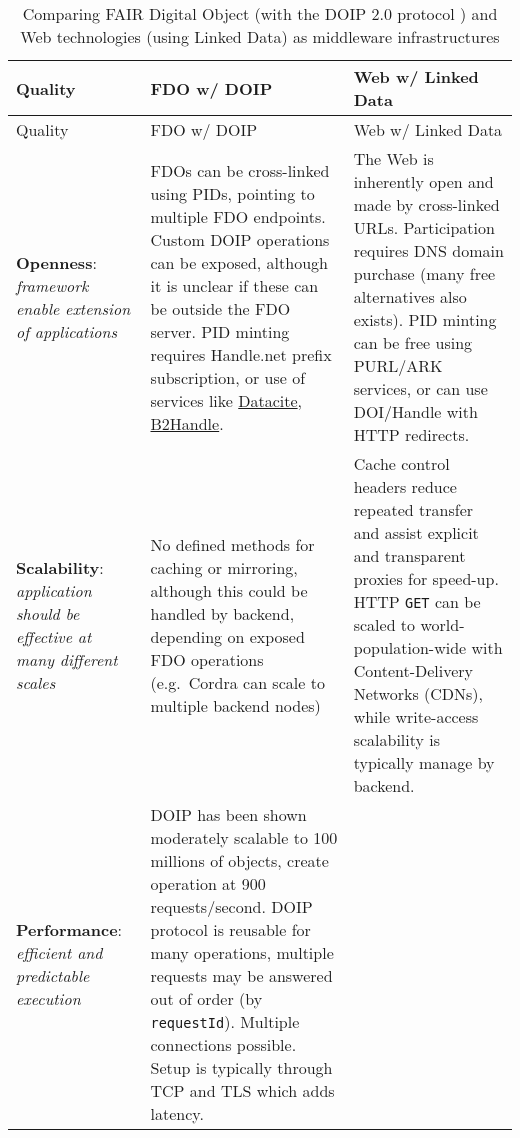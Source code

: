 \begin{landscape}
\begin{small}
\begin{longtable}[]{@{}
  >{\raggedright\arraybackslash}p{}
  >{\raggedright\arraybackslash}p{}
  >{\raggedright\arraybackslash}p{}@{}}
	\caption[Comparing FAIR Digital Object and Web technologies as middleware infrastructures]{Comparing FAIR Digital Object (with the DOIP 2.0 protocol \cite{foundationDigitalObjectInterface}) and Web technologies (using Linked Data) as middleware infrastructures \cite{zarrasComparisonFrameworkMiddleware2004a}
\label{tbl:fdo-web-middleware}}\tabularnewline
\toprule
Quality & 
FDO w/ DOIP & 
Web w/ Linked Data \\
\midrule
\endfirsthead
\toprule
Quality & 
FDO w/ DOIP & 
Web w/ Linked Data \\
\midrule
\endhead
\textbf{Openness}: \emph{framework enable extension of applications}
  & FDOs can be cross-linked using PIDs, pointing to multiple FDO endpoints. Custom DOIP operations can be exposed, although it is unclear if these can be outside the FDO server. PID minting requires Handle.net prefix subscription, or use of services like \href{https://datacite.org/}{Datacite}, \href{https://eudat.eu/services/userdoc/b2handle}{B2Handle}.
  & The Web is inherently open and made by cross-linked URLs. Participation requires DNS domain purchase (many free alternatives also exists). PID minting can be free using PURL/ARK services, or can use DOI/Handle with HTTP redirects. \\
\textbf{Scalability}: \emph{application should be effective at many different scales}
  & No defined methods for caching or mirroring, although this could be handled by backend, depending on exposed FDO operations (e.g.~Cordra can scale to multiple backend nodes)
  & Cache control headers reduce repeated transfer and assist explicit and transparent proxies for speed-up. HTTP \texttt{GET} can be scaled to world-population-wide with Content-Delivery Networks (CDNs), while write-access scalability is typically manage by backend. \\
\textbf{Performance}: \emph{efficient and predictable execution}
  & DOIP has been shown moderately scalable to 100 millions of objects, create operation at 900 requests/second. DOIP protocol is reusable for many operations, multiple requests may be answered out of order (by \texttt{requestId}). Multiple connections possible. Setup is typically through TCP and TLS which adds latency.

\end{longtable}
\end{small}
\end{landscape}
